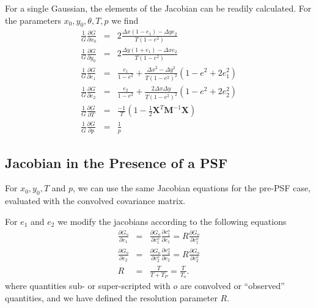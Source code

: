 \documentclass[12pt,preprint]{aastex}
\newcommand{\M}{\textbf{M}}
\newcommand{\X}{\textbf{X}}
\newcommand{\Dx}{\ensuremath{\Delta x}}
\newcommand{\Dy}{\ensuremath{\Delta y}}
\begin{document}
For a single Gaussian, the elements of the Jacobian can be readily
calculated.  For the parameters $x_0,y_0,\theta,T,p$ we find
\begin{eqnarray}
\frac{1}{G} \frac{\partial G}{\partial x_0}
    & = & 2 \frac{ \Dx (1-e_1) - \Dy e_2 }{T (1-e^2)} \\
\frac{1}{G} \frac{\partial G}{\partial y_0}
    & = & 2 \frac{ \Dy (1+e_1) - \Dx e_2 }{T (1-e^2)} \\
\frac{1}{G} \frac{\partial G}{\partial e_1}
  & = & \frac{e_1}{1-e^2} + \frac{\Dx^2-\Dy^2}{T (1-e^2)^2} (1-e^2 + 2 e_1^2) \\
\frac{1}{G} \frac{\partial G}{\partial e_2}
  & = & \frac{e_2}{1-e^2} + \frac{2 \Dx \Dy}{T (1-e^2)^2} (1-e^2 + 2 e_2^2) \\
\frac{1}{G} \frac{\partial G}{\partial T}
  & = & \frac{-1}{T} \left( 1 - \frac{1}{2} \X^T \M^{-1} \X  \right)  \\
\frac{1}{G} \frac{\partial G}{\partial p}
  & = & \frac{1}{p}
\end{eqnarray}

\subsection{Jacobian in the Presence of a PSF}

For $x_0,y_0,T$ and $p$, we can use the same Jacobian equations for the pre-PSF
case, evaluated with the convolved covariance matrix. 

For $e_1$ and $e_2$ we modify the jacobians according to the following equations
\begin{eqnarray}
\frac{\partial G_o}{\partial e_1} 
 & = & \frac{\partial G_o}{\partial e_1^o} \frac{\partial e_1^o}{\partial e_1} 
    =  R \frac{\partial G_o}{\partial e_1^o}\\
\frac{\partial G_o}{\partial e_2} 
 & = & \frac{\partial G_o}{\partial e_2^o} \frac{\partial e_2^o}{\partial e_2}
    =  R \frac{\partial G_o}{\partial e_2^o}\\
R & = & \frac{T}{T + T_P} = \frac{T}{T_o}.
\end{eqnarray}
where quantities sub- or super-scripted with $o$ are convolved or ``observed''
quantities, and we have defined the resolution parameter $R$.
\end{document}
